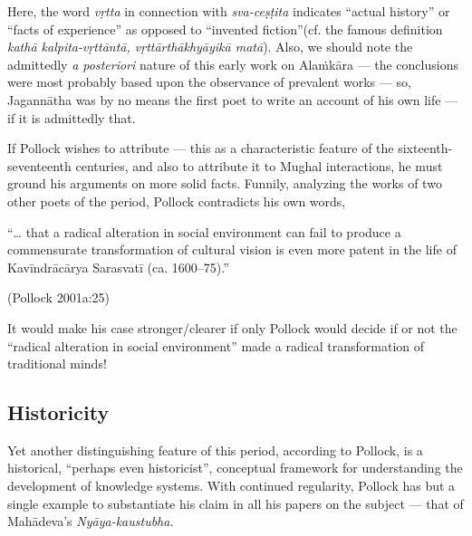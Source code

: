 Here, the word {\sl vṛtta} in connection with {\sl sva-ceṣṭita} indicates “actual history” or “facts of experience” as opposed to “invented fiction”(cf. the famous definition {\sl kathā kalpita-vṛttāntā, vṛttārthākhyāyikā matā}). Also, we should note the admittedly {\sl a posteriori} nature of this early work on Alaṁkāra — the conclusions were most probably based upon the observance of prevalent works — so, Jagannātha was by no means the first poet to write an account of his own life — if it is admittedly that.  

If Pollock wishes to attribute — this as a characteristic feature of the sixteenth-seventeenth centuries, and also to attribute it to Mughal interactions, he must ground his arguments on more solid facts. Funnily, analyzing the works of two other poets of the period, Pollock contradicts his own words,

 “… that a radical alteration in social environment can fail to produce a commensurate transformation of cultural vision is even more patent in the life of Kavīndrācārya Sarasvatī (ca. 1600–75).” 

\hfill (Pollock 2001a:25)

It would make his case stronger/clearer if only Pollock would decide if or not the “radical alteration in social environment” made a radical transformation of traditional minds!\\[-20pt] 

\subsection{Historicity}%

Yet another distinguishing feature of this period, according to Pollock, is a historical, “perhaps even historicist”, conceptual framework for understanding the development of knowledge systems. With continued regularity, Pollock has but a single example to substantiate his claim in all his papers on the subject — that of Mahādeva’s {\sl Nyāya-kaustubha}. 

